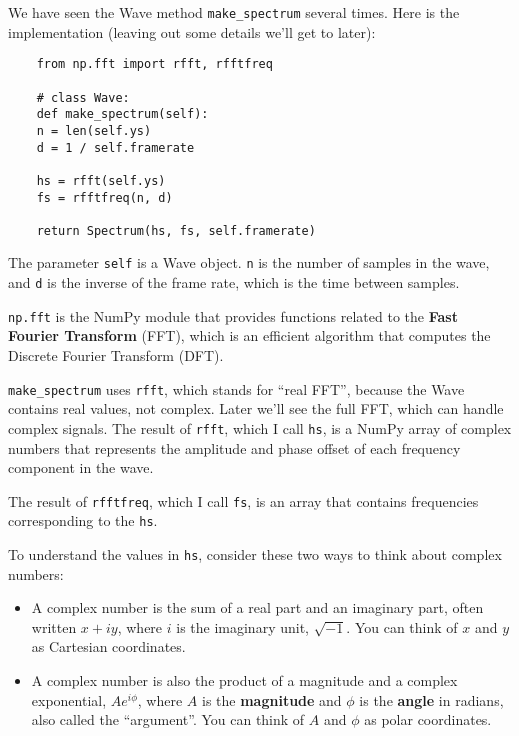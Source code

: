 We have seen the Wave method \verb"make_spectrum" several times.
Here is the implementation (leaving out some details we'll get
to later):

\begin{verbatim}
	from np.fft import rfft, rfftfreq
	
	# class Wave:
	def make_spectrum(self):
	n = len(self.ys)
	d = 1 / self.framerate
	
	hs = rfft(self.ys)
	fs = rfftfreq(n, d)
	
	return Spectrum(hs, fs, self.framerate)
\end{verbatim}

The parameter {\tt self} is a Wave object.  {\tt n} is the number
of samples in the wave, and {\tt d} is the inverse of the
frame rate, which is the time between samples.

{\tt np.fft} is the NumPy module that provides functions related
to the {\bf Fast Fourier Transform} (FFT), which is an efficient
algorithm that computes the Discrete Fourier Transform (DFT).

\verb"make_spectrum" uses {\tt rfft}, which stands for ``real
FFT'', because the Wave contains real values, not complex.  Later
we'll see the full FFT, which can handle complex signals.  The result
of {\tt rfft}, which I call {\tt hs}, is a NumPy array of complex
numbers that represents the amplitude and phase offset of each
frequency component in the wave.

The result of {\tt rfftfreq}, which I call {\tt fs}, is an array that
contains frequencies corresponding to the {\tt hs}.

To understand the values in {\tt hs}, consider these two ways to think
about complex numbers:

\begin{itemize}
	
	\item A complex number is the sum of a real part and an imaginary
	part, often written $x + iy$, where $i$ is the imaginary unit,
	$\sqrt{-1}$.  You can think of $x$ and $y$ as Cartesian coordinates.
	
	\item A complex number is also the product of a magnitude and a
	complex exponential, $A e^{i \phi}$, where $A$ is the {\bf
		magnitude} and $\phi$ is the {\bf angle} in radians, also called
	the ``argument''.  You can think of $A$ and $\phi$ as polar
	coordinates.
	
\end{itemize}

